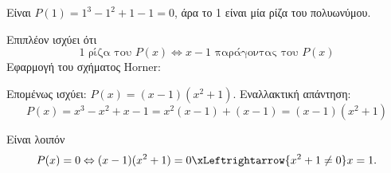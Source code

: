 \begin{alist}
\item Είναι $P(1) = 1^3 - 1^2 + 1 - 1 = 0$, άρα το 1 είναι μία ρίζα του πολυωνύμου.
\item Επιπλέον ισχύει ότι
\[1 \text{ ρίζα του } P(x) \Leftrightarrow x - 1 \text{ παράγοντας του } P(x)\]
Εφαρμογή του σχήματος Horner:
\begin{center}
\end{center}
Επομένως ισχύει: $P(x) = (x - 1)(x^2 + 1)$.
Εναλλακτική απάντηση:
\[P(x) = x^3 - x^2 + x - 1 = x^2(x - 1) + (x - 1) = (x - 1)(x^2 + 1)\]
\item Είναι λοιπόν
\[P(x) = 0 \Leftrightarrow (x - 1)(x^2 + 1) = 0 \xLeftrightarrow{x^2+1\ne0} x = 1.\]
\end{alist}

